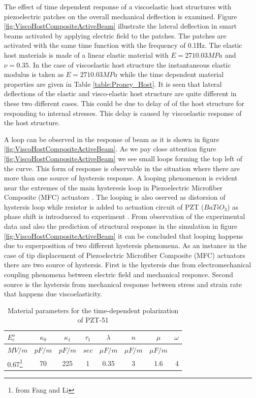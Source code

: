 The effect of time dependent response of a viscoelastic host structures with piezoelectric patches on the overall mechanical deflection is examined. 
Figure \ref{fig:ViscoHostCompositeActiveBeam} illustrate the lateral deflection in smart beams activated by applying electric field to the patches. 
The patches are activated with the same time function with the frequency of 0.1Hz. 
The elastic host materials is made of a linear elastic material with $E=2710.03 MPa$ and $\nu = 0.35$. 
In the case of viscoelastic host structure the instantaneous elastic modulus is taken as $E=2710.03 MPa$ while the time dependent material properties are given in Table \ref{table:Proney_Host}. 
It is seen that lateral deflections of the elastic and visco-elastic host structure are quite different in these two different cases. 
This could be due to delay of of the host structure for responding to internal stresses. 
This delay is caused by viscoelastic response of the host structure.

A loop can be observed in the response of beam as it is shown in figure \ref{fig:ViscoHostCompositeActiveBeam}. 
As we pay close attention figure \ref{fig:ViscoHostCompositeActiveBeam} we see small loops forming the top left of the curve.
This form of response is observable in the situation where there are more than one source of hystersis response.
A looping phenomenon is evident near the extremes of the main hysteresis loop in Piezoelectric Microfiber Composite (MFC) actuators \cite{usher2013piezoelectric}.
The looping is also oserved as distorsion of hystersis loop while resistor is added to actuation circuit of PZT ($BaTiO_3$) as phase shift is introdueced to experiment \cite{jaffe2012piezoelectric}.
From observation of the experimental data and also the prediction of structural response in the simulation in figure \ref{fig:ViscoHostCompositeActiveBeam} it can be concluded that looping happens due to superposition of two different hystersis phenomena.
As an instance in the case of tip displacement of Piezoelectric Microfiber Composite (MFC) actuators \cite{usher2013piezoelectric} there are two source of hystersis.
First is the hystersis due from electromechanical coupling phenomena between electric field and mechanical responce.
Second source is the hystersis from mechanical response between stress and strain rate that happens due viscoelasticity.   

\newpage

\begin{table}   
\caption{Material parameters for the time-dependent polarization of PZT-51}
\centering
\begin{tabular}{l c c c c c c r}
\hline 
$E_c^o$ & $\kappa_0$ & $\kappa_1$ & $\tau_1$ & $\lambda$ & $ n $ & $\mu$&  $\omega$ \\ \hline
$MV/m$ & $pF/m$ & $pF/m$ &  $sec$ & $\mu F/m$ & $\mu F/m $& $\mu F/m $\\ \hline 
0.67\footnote{from Fang and Li\cite{raey}}&70&225&1&0.35&3&1.6&4\\ \hline
\end{tabular}
\label{table:MatPZT-51}
\end{table}

